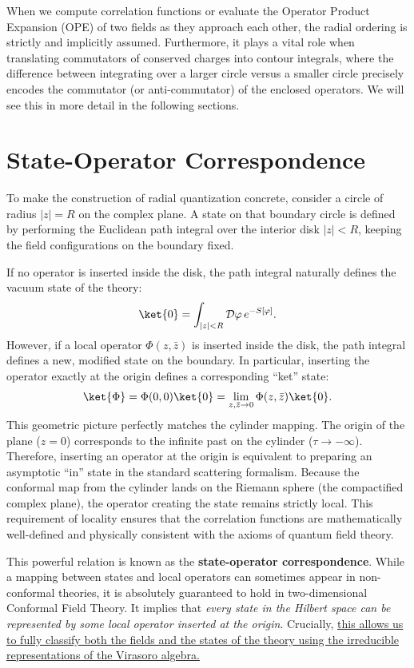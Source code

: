 When we compute correlation functions or evaluate the Operator Product Expansion (OPE) of two fields as they approach each other, the radial ordering is strictly and implicitly assumed. Furthermore, it plays a vital role when translating commutators of conserved charges into contour integrals, where the difference between integrating over a larger circle versus a smaller circle precisely encodes the commutator (or anti-commutator) of the enclosed operators. We will see this in more detail in the following sections.

\section{State-Operator Correspondence}

To make the construction of radial quantization concrete, consider a circle of radius \(|z| = R\) on the complex plane. A state on that boundary circle is defined by performing the Euclidean path integral over the interior disk \(|z| < R\), keeping the field configurations on the boundary fixed.

If no operator is inserted inside the disk, the path integral naturally defines the vacuum state of the theory:
\[
    \ket{0} = \int_{|z| < R} \mathcal{D}\varphi \, e^{-S[\varphi]} .
\]
However, if a local operator \(\Phi(z, \bar{z})\) is inserted inside the disk, the path integral defines a new, modified state on the boundary. In particular, inserting the operator exactly at the origin defines a corresponding ``ket'' state:
\[
    \ket{\Phi} = \Phi(0,0)\ket{0} = \lim_{z,\bar{z} \to 0} \Phi(z,\bar{z})\ket{0}.
\]
This geometric picture perfectly matches the cylinder mapping. The origin of the plane (\(z=0\)) corresponds to the infinite past on the cylinder (\(\tau \to -\infty\)). Therefore, inserting an operator at the origin is equivalent to preparing an asymptotic ``in'' state in the standard scattering formalism. Because the conformal map from the cylinder lands on the Riemann sphere (the compactified complex plane), the operator creating the state remains strictly local. This requirement of locality ensures that the correlation functions are mathematically well-defined and physically consistent with the axioms of quantum field theory.

This powerful relation is known as the \textbf{state-operator correspondence}. While a mapping between states and local operators can sometimes appear in non-conformal theories, it is absolutely guaranteed to hold in two-dimensional Conformal Field Theory. It implies that \textit{every state in the Hilbert space can be represented by some local operator inserted at the origin}. Crucially, \uline{this allows us to fully classify both the fields and the states of the theory using the irreducible representations of the Virasoro algebra.}

